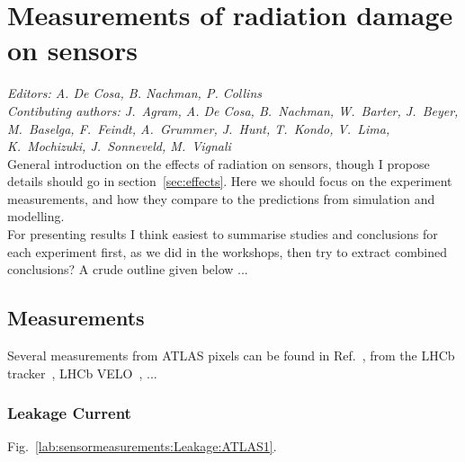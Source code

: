 \section{Measurements of radiation damage on sensors}
\label{sec:measurements}
{\it Editors: A. De Cosa, B. Nachman, P. Collins}  \\
{\it Contibuting authors: J.~Agram, A. De Cosa, B.~Nachman, W.~Barter, J.~Beyer, M.~Baselga, F.~Feindt, A.~Grummer, J.~Hunt, T.~Kondo, V.~Lima, K.~Mochizuki, J.~Sonneveld, M.~Vignali}  \\

\noindent 
General introduction on the effects of radiation on sensors, though I propose details should go in section~\ref{sec:effects}. Here we should focus on the experiment measurements, and how they compare to the predictions from simulation and modelling. \\
For presenting results I think easiest to summarise studies and conclusions for each experiment first, as we did in the workshops, then try to extract combined conclusions? A crude outline given below ...

\subsection{Measurements}

Several measurements from ATLAS pixels can be found in Ref.~\cite{Aaboud:2019wgd}, from the LHCb tracker~\cite{AbellanBeteta:2018wif}, LHCb VELO~\cite{Akiba:2633496}, ...

\subsubsection{Leakage Current}

Fig.~\ref{lab:sensormeasurements:Leakage:ATLAS1}.

